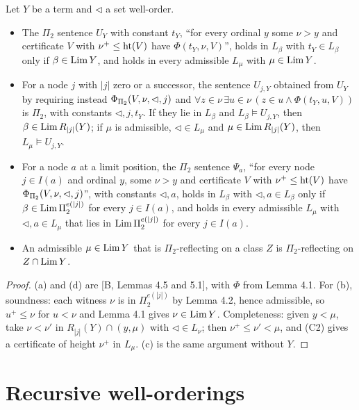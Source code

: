 \documentclass[11pt]{article}
\begin{document}
\begin{statement} Let $Y$ be a term and $\lhd$ a set well-order.
\begin{itemize}
\item[(a)] [B, Lemma 4.5] The $\Pi_2$ sentence $U_Y$ with constant $t_Y$, ``for every ordinal $y$ some $\nu > y$ and
  certificate $V$ with $\nu^+ \le \mathrm{ht}(V)$ have $\Phi(t_Y,\nu,V)$'', holds in $L_\beta$ with $t_Y \in L_\beta$ only if
  $\beta \in \mathrm{Lim}\, Y$, and holds in every admissible $L_\mu$ with $\mu \in \mathrm{Lim}\, Y$.
\item[(b)] For a node $j$ with $|j|$ zero or a successor, the sentence $U_{j,Y}$ obtained from $U_Y$ by requiring
  instead $\Phi_{\Pi_2}(V,\nu,\lhd,j)$ and $\forall z \in \nu\, \exists u \in \nu\, (z \in u \wedge \Phi(t_Y,u,V))$ is
  $\Pi_2$, with constants $\lhd, j, t_Y$. If they lie in $L_\beta$ and $L_\beta \models U_{j,Y}$, then $\beta \in \mathrm{Lim}\,
  R_{|j|}(Y)$; if $\mu$ is admissible, $\lhd \in L_\mu$ and $\mu \in \mathrm{Lim}\, R_{|j|}(Y)$, then $L_\mu \models U_{j,Y}$.
\item[(c)] For a node $a$ at a limit position, the $\Pi_2$ sentence $\Psi_a$, ``for every node $j \in I(a)$ and ordinal
  $y$, some $\nu > y$ and certificate $V$ with $\nu^+ \le \mathrm{ht}(V)$ have $\Phi_{\Pi_2}(V,\nu,\lhd,j)$'', with constants $\lhd,
  a$, holds in $L_\beta$ with $\lhd, a \in L_\beta$ only if $\beta \in \mathrm{Lim}\, \Pi_2^{e(|j|)}$ for every $j \in I(a)$, and holds in
  every admissible $L_\mu$ with $\lhd, a \in L_\mu$ that lies in $\mathrm{Lim}\, \Pi_2^{e(|j|)}$ for every $j \in I(a)$.
\item[(d)] [B, Lemma 5.1] An admissible $\mu \in \mathrm{Lim}\, Y$ that is $\Pi_2$-reflecting on a class $Z$ is
  $\Pi_2$-reflecting on $Z \cap \mathrm{Lim}\, Y$.
\end{itemize}
\end{statement}

\begin{proof}
(a) and (d) are [B, Lemmas 4.5 and 5.1], with $\Phi$ from Lemma 4.1. For (b), soundness: each witness $\nu$ is in
$\Pi_2^{e(|j|)}$ by Lemma 4.2, hence admissible, so $u^+ \le \nu$ for $u < \nu$ and Lemma 4.1 gives $\nu \in \mathrm{Lim}\, Y$.
Completeness: given $y < \mu$, take $\nu < \nu'$ in $R_{|j|}(Y) \cap (y, \mu)$ with $\lhd \in L_\nu$; then $\nu^+ \le
\nu' < \mu$, and (C2) gives a certificate of height $\nu^+$ in $L_\mu$. (c) is the same argument without $Y$.
\end{proof}

\section{Recursive well-orderings}
\end{document}

